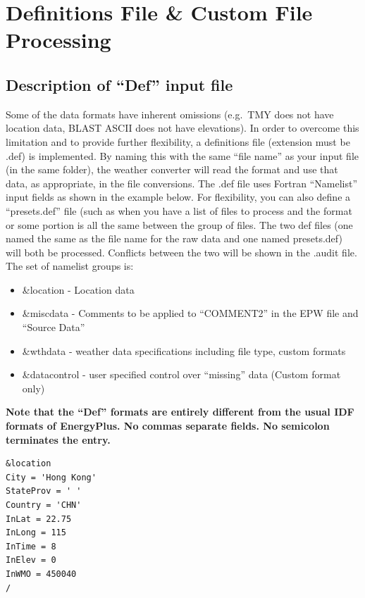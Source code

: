 \section{Definitions File \& Custom File Processing}\label{definitions-file-custom-file-processing}

\subsection{Description of ``Def'' input file}\label{description-of-def-input-file}

Some of the data formats have inherent omissions (e.g.~TMY does not have location data, BLAST ASCII does not have elevations). In order to overcome this limitation and to provide further flexibility, a definitions file (extension must be .def) is implemented. By naming this with the same ``file name'' as your input file (in the same folder), the weather converter will read the format and use that data, as appropriate, in the file conversions. The .def file uses Fortran ``Namelist'' input fields as shown in the example below. For flexibility, you can also define a ``presets.def'' file (such as when you have a list of files to process and the format or some portion is all the same between the group of files. The two def files (one named the same as the file name for the raw data and one named presets.def) will both be processed. Conflicts between the two will be shown in the .audit file. The set of namelist groups is:

\begin{itemize}
\item
  \&location - Location data
\item
  \&miscdata - Comments to be applied to ``COMMENT2'' in the EPW file and ``Source Data''
\item
  \&wthdata - weather data specifications including file type, custom formats
\item
  \&datacontrol - user specified control over ``missing'' data (Custom format only)
\end{itemize}

\textbf{Note that the ``Def'' formats are entirely different from the usual IDF formats of EnergyPlus. No commas separate fields. No semicolon terminates the entry.}

\begin{lstlisting}
&location
City = 'Hong Kong'
StateProv = ' '
Country = 'CHN'
InLat = 22.75
InLong = 115
InTime = 8
InElev = 0
InWMO = 450040
/
\end{lstlisting}


